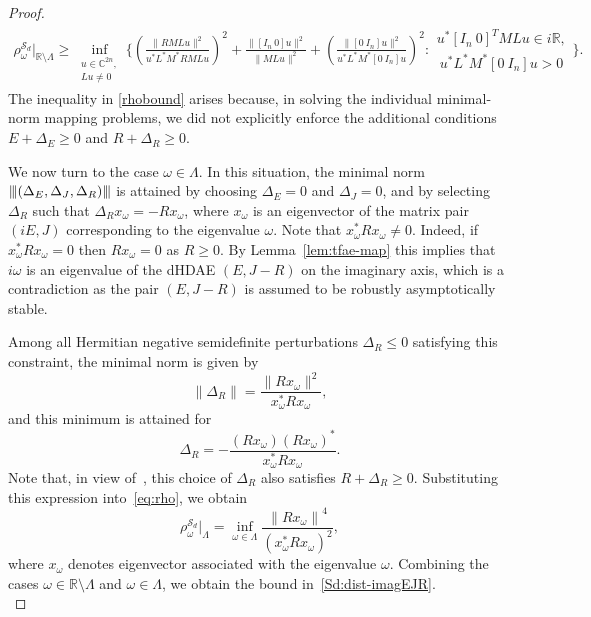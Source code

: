 \documentclass[11pt]{article}
\newcommand{\R}{\mathbb R}
\newcommand{\C}{\mathbb C}
\newcommand{\nnrm}[1]{{\left\vert\kern-0.25ex\left\vert\kern-0.25ex\left\vert #1
		\right\vert\kern-0.25ex\right\vert\kern-0.25ex\right\vert}}
\begin{document}
\begin{proof}
    \begin{align}
        \rho_\omega^{\mathcal S_d}\Big|_{\R\setminus \Lambda}\geq {\inf_{\substack{u\in\C^{2n},\\Lu\neq 0}}\Bigg\{\left(\frac{\|RMLu\|^2}{u^*L^*M^*RMLu}\right)^2+\frac{\|[I_n~0] u\|^2}{\|MLu\|^2} + \left(\frac{\|[0~I_n] u\|^2}{u^*L^*M^*[0~I_n] u}\right)^2: \begin{matrix} u^*[I_n~0]^TMLu \in i\R,\\ ~u^*L^*M^*[0~I_n]u>0 \end{matrix}\Bigg\}}.
        \label{rhobound}
    \end{align}
    The inequality in \eqref{rhobound} arises because, in solving the individual minimal-norm mapping problems, we did not explicitly enforce the additional conditions $E+\Delta_E\geq 0$ and $R+\Delta_R\geq 0$.

    We now turn to the case $\omega \in \Lambda$. In this situation, the minimal norm $\nnrm{(\Delta_E,\Delta_J,\Delta_R)}$ is attained by choosing $\Delta_E=0$ and $\Delta_J=0$, and by selecting $\Delta_R$ such that $\Delta_R x_\omega = - R x_\omega$, where $x_\omega$ is an eigenvector of the matrix pair $(iE,J)$ corresponding to the eigenvalue $\omega$.
   Note that $x_\omega^*Rx_\omega \neq 0$. Indeed, if $x_\omega^*Rx_\omega = 0$ then $Rx_\omega=0$ as $R \geq 0$. By Lemma~\ref{lem:tfae-map} this implies that $i\omega$ is an eigenvalue of the dHDAE $(E,J-R)$ on the imaginary axis, which is a contradiction as the pair $(E,J-R)$ is assumed to be robustly asymptotically stable.

    Among all Hermitian negative semidefinite perturbations $\Delta_R \leq 0$ satisfying this constraint, the minimal norm is given by
    \[
    \|\Delta_R\| = \frac{\|R x_\omega\|^2}{x_\omega^* R x_\omega},
    \]
    and this minimum is attained for
    \[
    \Delta_R = -\frac{(R x_\omega)(R x_\omega)^*}{x_\omega^* R x_\omega}.
    \]
    Note that, in view of~\cite[Lemma 4.1]{MehMS16}, this choice of $\Delta_R$ also satisfies $R+\Delta_R \geq 0$. Substituting this expression into~\eqref{eq:rho}, we obtain
    \[
    \rho_\omega^{\mathcal S_d}\big|_{\Lambda} = \inf_{\omega \in \Lambda} \frac{{\|R x_\omega\|}^4}{{(x_\omega^* R x_\omega)}^2},
    \]
    where $x_\omega$ denotes eigenvector associated with the eigenvalue $\omega$. Combining the cases $\omega\in\mathbb{R}\setminus\Lambda$ and $\omega\in\Lambda$, we obtain the bound in~\eqref{Sd:dist-imagEJR}.\\


\end{proof}
\end{document}
